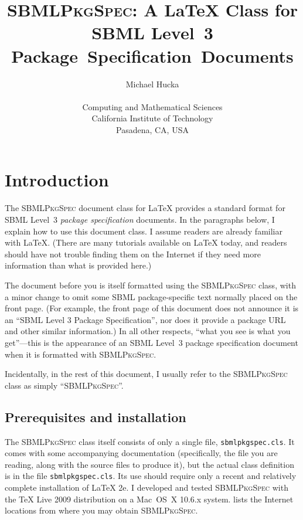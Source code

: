 \documentclass{sbmlpkgspec}
\newcommand{\sbmlpkg}{\textsc{SBMLPkgSpec}\xspace}
\newcommand{\sbmlpkgfile}{\texttt{sbmlpkgspec.cls}\xspace}
\newcommand{\latex}{\LaTeX{}\xspace}
\begin{document}
\packageTitle{\latex Class for SBML Package Specifications}

\title{\sbmlpkg: A \latex Class for SBML Level~3 \mbox{Package Specification Documents}}

\author{Michael Hucka\\[0.25em]
  \\[0.25em]
  Computing and Mathematical Sciences\\
  California Institute of Technology\\
  Pasadena, CA, USA
}

\maketitlepage
\maketableofcontents


\section{Introduction}

The \sbmlpkg document class for \latex provides a standard format for SBML
Level~3 \emph{package specification} documents.  In the paragraphs below, I
explain how to use this document class.  I assume readers are already
familiar with \latex.  (There are many tutorials available on \latex today,
and readers should have not trouble finding them on the Internet if they
need more information than what is provided here.)

The document before you is itself formatted using the \sbmlpkg class, with
a minor change to omit some SBML package-specific text normally placed on
the front page.  (For example, the front page of this document does not
announce it is an ``SBML Level 3 Package Specification'', nor does it
provide a package URL and other similar information.)  In all other
respects, ``what you see is what you get''---this is the appearance of an
SBML Level~3 package specification document when it is formatted with
\sbmlpkg.

Incidentally, in the rest of this document, I usually refer to the \sbmlpkg
class as simply ``\sbmlpkg''.



\subsection{Prerequisites and installation}

The \sbmlpkg class itself consists of only a single file, \sbmlpkgfile.  It
comes with some accompanying documentation (specifically, the file you are
reading, along with the source files to produce it), but the actual class
definition is in the file \sbmlpkgfile.  Its use should require only a
recent and relatively complete installation of \latex2e.  I developed and
tested \sbmlpkg with the TeX Live 2009 distribution on a Mac~OS~X 10.6.x
system.   lists the Internet locations from where you may obtain
\sbmlpkg.
\end{document}

